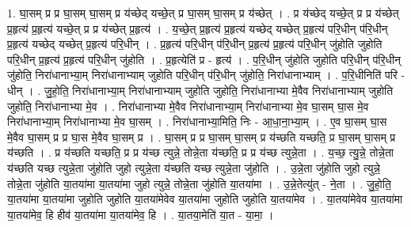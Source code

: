 \documentclass[17pt]{extarticle}
\begin{document}
1. घा॒सम् प्र प्र घा॒सम् घा॒सम् प्र य॑च्छेद् यच्छे॒त् प्र घा॒सम् घा॒सम् प्र य॑च्छेत् । . प्र य॑च्छेद् यच्छे॒त् प्र प्र य॑च्छेत् प्र॒हृत्य॑ प्र॒हृत्य॑ यच्छे॒त् प्र प्र य॑च्छेत् प्र॒हृत्य॑ । . य॒च्छे॒त् प्र॒हृत्य॑ प्र॒हृत्य॑ यच्छेद् यच्छेत् प्र॒हृत्य॑ परि॒धीन् प॑रि॒धीन् प्र॒हृत्य॑ यच्छेद् यच्छेत् प्र॒हृत्य॑ परि॒धीन् । . प्र॒हृत्य॑ परि॒धीन् प॑रि॒धीन् प्र॒हृत्य॑ प्र॒हृत्य॑ परि॒धीन् जु॑होति जुहोति परि॒धीन् प्र॒हृत्य॑ प्र॒हृत्य॑ परि॒धीन् जु॑होति । . प्र॒हृत्येति॑ प्र - हृत्य॑ । . प॒रि॒धीन् जु॑होति जुहोति परि॒धीन् प॑रि॒धीन् जु॑होति॒ निरा॑धानाभ्या॒म् निरा॑धानाभ्याम् जुहोति परि॒धीन् प॑रि॒धीन् जु॑होति॒ निरा॑धानाभ्याम् । . प॒रि॒धीनिति॑ परि - धीन् । . जु॒हो॒ति॒ निरा॑धानाभ्या॒म् निरा॑धानाभ्याम् जुहोति जुहोति॒ निरा॑धानाभ्या मे॒वैव निरा॑धानाभ्याम् जुहोति जुहोति॒ निरा॑धानाभ्या मे॒व । . निरा॑धानाभ्या मे॒वैव निरा॑धानाभ्या॒म् निरा॑धानाभ्या मे॒व घा॒सम् घा॒स मे॒व निरा॑धानाभ्या॒म् निरा॑धानाभ्या मे॒व घा॒सम् । . निरा॑धानाभ्या॒मिति॒ निः - आ॒धा॒ना॒भ्या॒म् । . ए॒व घा॒सम् घा॒स मे॒वैव घा॒सम् प्र प्र घा॒स मे॒वैव घा॒सम् प्र । . घा॒सम् प्र प्र घा॒सम् घा॒सम् प्र य॑च्छति यच्छति॒ प्र घा॒सम् घा॒सम् प्र य॑च्छति । . प्र य॑च्छति यच्छति॒ प्र प्र य॑च्छ त्युन्ने॒ तोन्ने॒ता य॑च्छति॒ प्र प्र य॑च्छ त्युन्ने॒ता । . य॒च्छ॒ त्यु॒न्ने॒ तोन्ने॒ता य॑च्छति यच्छ त्युन्ने॒ता जु॑होति जुहो त्युन्ने॒ता य॑च्छति यच्छ त्युन्ने॒ता जु॑होति । . उ॒न्ने॒ता जु॑होति जुहो त्युन्ने॒ तोन्ने॒ता जु॑होति या॒तया॑मा या॒तया॑मा जुहो त्युन्ने॒ तोन्ने॒ता जु॑होति या॒तया॑मा । . उ॒न्ने॒तेत्यु॑त् - ने॒ता । . जु॒हो॒ति॒ या॒तया॑मा या॒तया॑मा जुहोति जुहोति या॒तया॑मेवेव या॒तया॑मा जुहोति जुहोति या॒तया॑मेव । . या॒तया॑मेवेव या॒तया॑मा या॒तया॑मेव॒ हि हीव॑ या॒तया॑मा या॒तया॑मेव॒ हि । . या॒तया॒मेति॑ या॒त - या॒मा॒ । \newline
\end{document}
